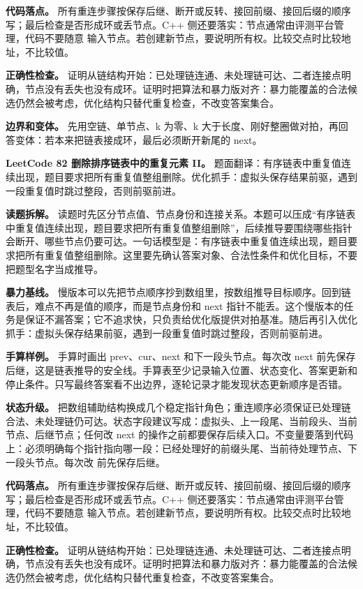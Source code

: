 \textbf{代码落点。} 所有重连步骤按保存后继、断开或反转、接回前缀、接回后缀的顺序写；最后检查是否形成环或丢节点。C++ 侧还要落实：节点通常由评测平台管理，代码不要随意  输入节点。若创建新节点，要说明所有权。比较交点时比较地址，不比较值。

\textbf{正确性检查。} 证明从链结构开始：已处理链连通、未处理链可达、二者连接点明确，节点没有丢失也没有成环。证明时把算法和暴力版对齐：暴力能覆盖的合法候选仍然会被考虑，优化结构只替代重复检查，不改变答案集合。

\textbf{边界和变体。} 先用空链、单节点、k 为零、k 大于长度、刚好整圈做对拍，再回答变体：若本来把链表接成环，最后必须断开新尾的 next。

\noindent\textbf{LeetCode 82 删除排序链表中的重复元素 II。} 题面翻译：有序链表中重复值连续出现，题目要求把所有重复值整组删除。优化抓手：虚拟头保存结果前驱，遇到一段重复值时跳过整段，否则前驱前进。

\textbf{读题拆解。} 读题时先区分节点值、节点身份和连接关系。本题可以压成“有序链表中重复值连续出现，题目要求把所有重复值整组删除”，后续推导要围绕哪些指针会断开、哪些节点仍要可达。一句话模型是：有序链表中重复值连续出现，题目要求把所有重复值整组删除。这里要先确认答案对象、合法性条件和优化目标，不要把题型名字当成推导。

\textbf{暴力基线。} 慢版本可以先把节点顺序抄到数组里，按数组推导目标顺序。回到链表后，难点不再是值的顺序，而是节点身份和 next 指针不能丢。这个慢版本的任务是保证不漏答案；它不追求快，只负责给优化版提供对拍基准。随后再引入优化抓手：虚拟头保存结果前驱，遇到一段重复值时跳过整段，否则前驱前进。

\textbf{手算样例。} 手算时画出 prev、cur、next 和下一段头节点。每次改 next 前先保存后继，这是链表推导的安全线。手算表至少记录输入位置、状态变化、答案更新和停止条件。只写最终答案看不出边界，逐轮记录才能发现状态更新顺序是否错。

\textbf{状态升级。} 把数组辅助结构换成几个稳定指针角色；重连顺序必须保证已处理链合法、未处理链仍可达。状态字段建议写成：虚拟头、上一段尾、当前段头、当前节点、后继节点；任何改 next 的操作之前都要保存后续入口。不变量要落到代码上：必须明确每个指针指向哪一段：已经处理好的前缀头尾、当前待处理节点、下一段头节点。每次改  前先保存后继。

\textbf{代码落点。} 所有重连步骤按保存后继、断开或反转、接回前缀、接回后缀的顺序写；最后检查是否形成环或丢节点。C++ 侧还要落实：节点通常由评测平台管理，代码不要随意  输入节点。若创建新节点，要说明所有权。比较交点时比较地址，不比较值。

\textbf{正确性检查。} 证明从链结构开始：已处理链连通、未处理链可达、二者连接点明确，节点没有丢失也没有成环。证明时把算法和暴力版对齐：暴力能覆盖的合法候选仍然会被考虑，优化结构只替代重复检查，不改变答案集合。

